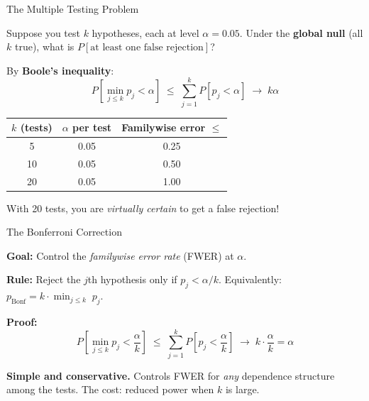 \documentclass[handout, aspectratio=169]{beamer}
\numberwithin{equation}{section}
\begin{document}
\begin{frame}{The Multiple Testing Problem}

Suppose you test $k$ hypotheses, each at level $\alpha = 0.05$.  Under the \textbf{global null} (all $k$ true), what is $P[\text{at least one false rejection}]$?

\pause
\smallskip

By \textbf{Boole's inequality}:
$$P\!\left[\min_{j \leq k} p_j < \alpha\right] \;\leq\; \sum_{j=1}^k P[p_j < \alpha] \;\to\; k\alpha$$

\pause

\begin{center}
\renewcommand{\arraystretch}{1.2}
\begin{tabular}{ccc}
\toprule
$k$ (tests) & $\alpha$ per test & Familywise error $\leq$ \\
\midrule
5 & 0.05 & 0.25 \\
10 & 0.05 & 0.50 \\
20 & 0.05 & 1.00 \\
\bottomrule
\end{tabular}
\end{center}

With 20 tests, you are \emph{virtually certain} to get a false rejection!
\end{frame}

\begin{frame}{The Bonferroni Correction}

\textbf{Goal:} Control the \emph{familywise error rate} (FWER) at $\alpha$.

\pause
\smallskip

\textbf{Rule:} Reject the $j$th hypothesis only if $p_j < \alpha / k$. \quad Equivalently: $p_{\text{Bonf}} = k \cdot \min_{j \leq k}\; p_j$.

\pause
\smallskip

\textbf{Proof:}
$$P\!\left[\min_{j \leq k} p_j < \frac{\alpha}{k}\right] \;\leq\; \sum_{j=1}^k P\!\left[p_j < \frac{\alpha}{k}\right] \;\to\; k \cdot \frac{\alpha}{k} = \alpha$$

\pause
\smallskip

\begin{tcolorbox}[colback=blue!5, colframe=blue!50]
\textbf{Simple and conservative.}  Controls FWER for \emph{any} dependence structure among the tests.  The cost: reduced power when $k$ is large.
\end{tcolorbox}
\end{frame}
\end{document}
